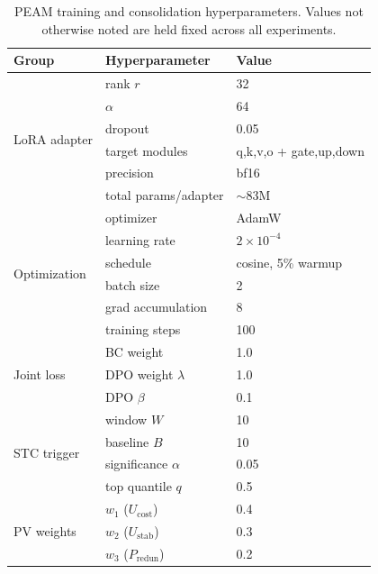 \documentclass[11pt]{article}
\begin{document}
\begin{table}[h]
\centering
\small
\setlength{\tabcolsep}{5pt}
\caption{PEAM training and consolidation hyperparameters.
Values not otherwise noted are held fixed across all
experiments.}
\label{tab:hparams}
\begin{tabular}{lll}
\toprule
Group & Hyperparameter & Value \\
\midrule
\multirow{6}{*}{LoRA adapter}
    & rank $r$           & 32 \\                    %
    & $\alpha$           & 64 \\                    %
    & dropout            & 0.05 \\                  %
    & target modules     & q,k,v,o + gate,up,down \\ %
    & precision          & bf16 \\                  %
    & total params/adapter & $\sim$83M \\           %
\midrule
\multirow{6}{*}{Optimization}
    & optimizer          & AdamW \\
    & learning rate      & $2 \times 10^{-4}$ \\    %
    & schedule           & cosine, 5\% warmup \\    %
    & batch size         & 2 \\                     %
    & grad accumulation  & 8 \\                     %
    & training steps     & 100 \\
\midrule
\multirow{3}{*}{Joint loss}
    & BC weight          & 1.0 \\
    & DPO weight $\lambda$ & 1.0 \\
    & DPO $\beta$        & 0.1 \\
\midrule
\multirow{4}{*}{STC trigger}
    & window $W$         & 10 \\
    & baseline $B$       & 10 \\
    & significance $\alpha$ & 0.05 \\
    & top quantile $q$   & 0.5 \\
\midrule
\multirow{4}{*}{PV weights}
    & $w_1$ ($U_{\text{cost}}$)   & 0.4 \\          %
    & $w_2$ ($U_{\text{stab}}$)   & 0.3 \\          %
    & $w_3$ ($P_{\text{redun}}$)  & 0.2 \\          %

\end{tabular}
\end{table}
\end{document}
